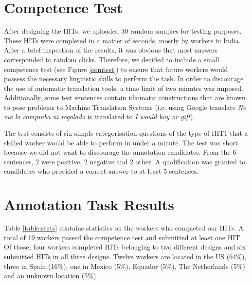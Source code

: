 \documentclass[11pt]{elsarticle}
\begin{document}
\section{Competence Test}
\label{sect:comtest}

\begin{figure*}[h]
  \begin{center}
\caption{Competence test.}
\label{comtest}
  \end{center}
\end{figure*}

After designing the HITs, we uploaded 30 random samples for testing purposes. These HITs were completed in a matter of seconds, mostly by workers in India. After a brief inspection of the results, it was obvious that most answers corresponded to random clicks. Therefore, we decided to include a small competence test (see Figure \ref{comtest}) to ensure that future workers would possess the necessary linguistic skills to perform the task. In order to discourage the use of automatic translation tools, a time limit of two minutes was imposed. Additionally, some test sentences contain idiomatic constructions that are known to pose problems to Machine Translation Systems (i.e. using Google translate \textit{No me lo compraba ni regalado} is translated to \textit{I would buy or gift}).

The test consists of six simple categorisation questions of the type of HIT1 that a skilled worker would be able to perform in under a minute. The test was short because we did not want to discourage the annotation candidates. From the 6 sentences, 2 were positive, 2 negative and 2 other. A qualification was granted to candidates who provided a correct answer to at least 5 sentences.


\section{Annotation Task Results}
\label{sect:results}

Table \ref{table:stats} contains statistics on the workers who completed our HITs. A total of 19 workers passed the competence test and submitted at least one HIT. Of those, four workers completed HITs belonging to two different designs and six submitted HITs in all three designs. Twelve workers are located in the US (64\%), three in Spain (16\%), one in Mexico (5\%), Equador (5\%), The Netherlands (5\%) and an unknown location (5\%).
\end{document}
